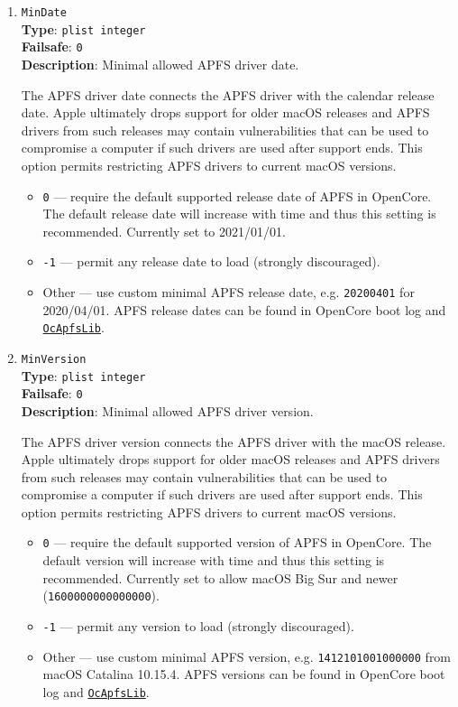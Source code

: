 \documentclass[]{article}
\providecommand{\tightlist}{%
  \setlength{\itemsep}{0pt}\setlength{\parskip}{0pt}}
\begin{document}
\begin{enumerate}
\item
  \texttt{MinDate}\\
  \textbf{Type}: \texttt{plist\ integer}\\
  \textbf{Failsafe}: \texttt{0}\\
  \textbf{Description}: Minimal allowed APFS driver date.

  The APFS driver date connects the APFS driver with the calendar release date.
  Apple ultimately drops support for older macOS releases and APFS drivers from
  such releases may contain vulnerabilities that can be used to compromise
  a computer if such drivers are used after support ends. This option
  permits restricting APFS drivers to current macOS versions.

  \begin{itemize}
    \tightlist
    \item \texttt{0} --- require the default supported release date of APFS
    in OpenCore. The default release date will increase with time and thus
    this setting is recommended. Currently set to 2021/01/01.
    \item \texttt{-1} --- permit any release date to load (strongly discouraged).
    \item Other --- use custom minimal APFS release date, e.g. \texttt{20200401}
    for 2020/04/01. APFS release dates can be found in OpenCore boot log
    and \href{https://github.com/acidanthera/OpenCorePkg/blob/master/Include/Acidanthera/Library/OcApfsLib.h}{\texttt{OcApfsLib}}.
  \end{itemize}

\item
  \texttt{MinVersion}\\
  \textbf{Type}: \texttt{plist\ integer}\\
  \textbf{Failsafe}: \texttt{0}\\
  \textbf{Description}: Minimal allowed APFS driver version.

  The APFS driver version connects the APFS driver with the macOS release.
  Apple ultimately drops support for older macOS releases and APFS drivers from
  such releases may contain vulnerabilities that can be used to compromise
  a computer if such drivers are used after support ends. This option
  permits restricting APFS drivers to current macOS versions.

  \begin{itemize}
    \tightlist
    \item \texttt{0} --- require the default supported version of APFS
    in OpenCore. The default version will increase with time and thus
    this setting is recommended. Currently set to allow macOS Big Sur and newer
    (\texttt{1600000000000000}).
    \item \texttt{-1} --- permit any version to load (strongly discouraged).
    \item Other --- use custom minimal APFS version, e.g. \texttt{1412101001000000}
    from macOS Catalina 10.15.4. APFS versions can be found in OpenCore boot log
    and \href{https://github.com/acidanthera/OpenCorePkg/blob/master/Include/Acidanthera/Library/OcApfsLib.h}{\texttt{OcApfsLib}}.
  \end{itemize}


\end{enumerate}
\end{document}
